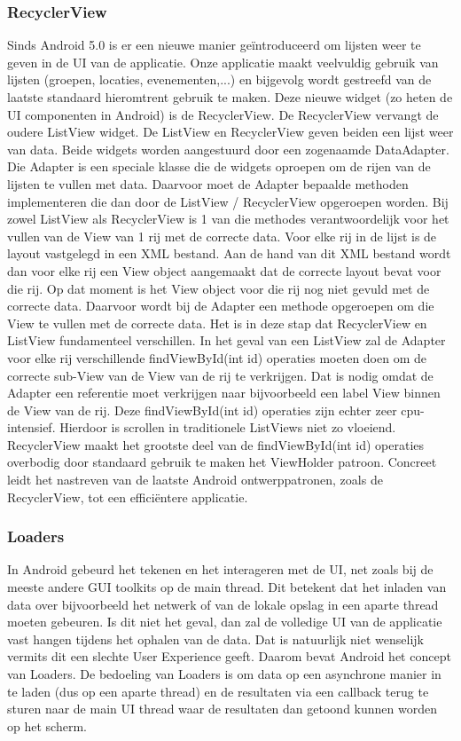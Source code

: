 \subsubsection{RecyclerView}
Sinds Android 5.0 is er een nieuwe manier geïntroduceerd om lijsten weer te geven in de UI van de applicatie. Onze applicatie maakt veelvuldig gebruik van lijsten (groepen, locaties, evenementen,...) en bijgevolg wordt gestreefd van de laatste standaard hieromtrent gebruik te maken. Deze nieuwe widget (zo heten de UI componenten in Android) is de RecyclerView. De RecyclerView vervangt de oudere ListView widget.
De ListView en RecyclerView geven beiden een lijst weer van data. Beide widgets worden aangestuurd door een zogenaamde DataAdapter. Die Adapter is een speciale klasse die de widgets oproepen om de rijen van de lijsten te vullen met data. Daarvoor moet de Adapter bepaalde methoden implementeren die dan door de ListView / RecyclerView opgeroepen worden. Bij zowel ListView als RecyclerView is 1 van die methodes verantwoordelijk voor het vullen van de View van 1 rij met de correcte data.
Voor elke rij in de lijst is de layout vastgelegd in een XML bestand. Aan de hand van dit XML bestand wordt dan voor elke rij een View object aangemaakt dat de correcte layout bevat voor die rij. Op dat moment is het View object voor die rij nog niet gevuld met de correcte data. Daarvoor wordt bij de Adapter een methode opgeroepen om die View te vullen met de correcte data.
Het is in deze stap dat RecyclerView en ListView fundamenteel verschillen. In het geval van een ListView zal de Adapter voor elke rij verschillende findViewById(int id) operaties moeten doen om de correcte sub-View van de View van de rij te verkrijgen. Dat is nodig omdat de Adapter een referentie moet verkrijgen naar bijvoorbeeld een label View binnen de View van de rij. Deze findViewById(int id) operaties zijn echter zeer cpu-intensief. Hierdoor is scrollen in traditionele ListViews niet zo vloeiend.
RecyclerView maakt het grootste deel van de findViewById(int id) operaties overbodig door standaard gebruik te maken het ViewHolder patroon.
Concreet leidt het nastreven van de laatste Android ontwerppatronen, zoals de RecyclerView, tot een efficiëntere applicatie.

\subsubsection{Loaders}
In Android gebeurd het tekenen en het interageren met de UI, net zoals bij de meeste andere GUI toolkits op de main thread. Dit betekent dat het inladen van data over bijvoorbeeld het netwerk of van de lokale opslag in een aparte thread moeten gebeuren. Is dit niet het geval, dan zal de volledige UI van de applicatie vast hangen tijdens het ophalen van de data. Dat is natuurlijk niet wenselijk vermits dit een slechte User Experience geeft.
Daarom bevat Android het concept van Loaders. De bedoeling van Loaders is om data op een asynchrone manier in te laden (dus op een aparte thread) en de resultaten via een callback terug te sturen naar de main UI thread waar de resultaten dan getoond kunnen worden op het scherm. 
\newline\newline

